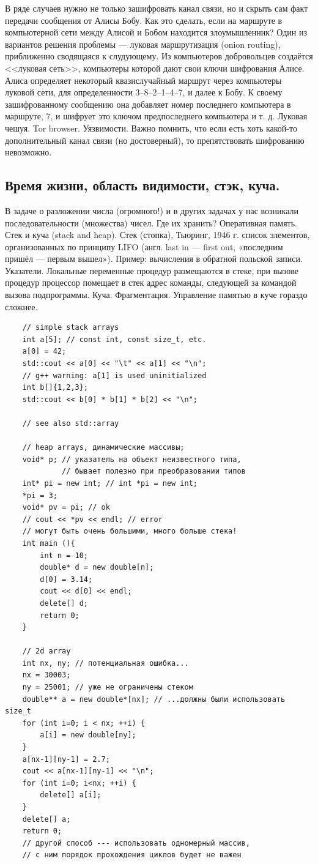\documentclass{book}
\begin{document}
В ряде случаев нужно не только зашифровать канал связи, но и скрыть сам факт передачи сообщения от
Алисы Бобу. Как это сделать, если на маршруте в компьютерной сети между Алисой и Бобом находится
злоумышленник? Один из вариантов решения проблемы --- луковая маршрутизация (onion routing),
приближенно сводящаяся к слудующему. Из компьютеров добровольцев создаётся <<луковая сеть>>,
компьютеры которой дают свои ключи шифрования Алисе. Алиса определяет некоторый квазислучайный
маршрут через компьютеры луковой сети, для определенности 3--8--2--1--4--7, и далее к Бобу. К
своему зашифрованному сообщению она добавляет номер последнего компьютера в маршруте, 7, и шифрует
это ключом предпоследнего компьютера и т. д. Луковая чешуя. Tor browser. Уязвимости. Важно помнить,
что если есть хоть какой-то дополнительный канал связи (но достоверный), то препятствовать
шифрованию невозможно.

\subsection{Время жизни, область видимости, стэк, куча.}

В задаче о разложении числа (огромного!) и в других задачах у нас возникали последовательности
(множества) чисел. Где их хранить? Оперативная память. Стек и
куча (stack and heap). Стек (стопка), Тьюринг, 1946 г. список элементов, организованных по принципу LIFO
(англ. last in — first out, «последним пришёл — первым вышел»). Пример: вычисления в обратной
польской записи. Указатели. Локальные переменные
процедур размещаются в стеке, при вызове процедур процессор помещает в стек адрес команды,
следующей за командой вызова подпрограммы. Куча. Фрагментация. Управление памятью в куче гораздо сложнее.

\begin{verbatim}
    // simple stack arrays
    int a[5]; // const int, const size_t, etc.
    a[0] = 42;
    std::cout << a[0] << "\t" << a[1] << "\n";
    // g++ warning: a[1] is used uninitialized
    int b[]{1,2,3};
    std::cout << b[0] * b[1] * b[2] << "\n";

    // see also std::array

    // heap arrays, динамические массивы;
    void* p; // указатель на объект неизвестного типа,
             // бывает полезно при преобразовании типов
    int* pi = new int; // int *pi = new int;
    *pi = 3;
    void* pv = pi; // ok
    // cout << *pv << endl; // error
    // могут быть очень большими, много больше стека!
    int main (){
        int n = 10;
        double* d = new double[n];
        d[0] = 3.14;
        cout << d[0] << endl;
        delete[] d;
        return 0;
    }

    // 2d array
    int nx, ny; // потенциальная ошибка...
    nx = 30003;
    ny = 25001; // уже не ограничены стеком
    double** a = new double*[nx]; // ...должны были использовать size_t
    for (int i=0; i < nx; ++i) {
        a[i] = new double[ny];
    }
    a[nx-1][ny-1] = 2.7;
    cout << a[nx-1][ny-1] << "\n";
    for (int i=0; i<nx; ++i) {
        delete[] a[i];
    }
    delete[] a;
    return 0;
    // другой способ --- использовать одномерный массив,
    // с ним порядок прохождения циклов будет не важен
\end{verbatim}
\end{document}

